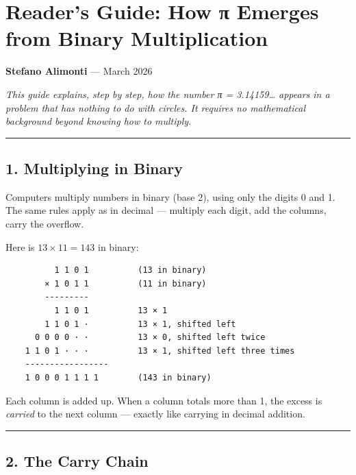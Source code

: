 \documentclass[
  11pt,
]{article}
\author{Stefano Alimonti --- stefalimonti@gmail.com}
\date{March 2026}
\begin{document}
{
\hypersetup{linkcolor=black}
\setcounter{tocdepth}{2}
\tableofcontents
}
\section{Reader's Guide: How π Emerges from Binary
Multiplication}\label{readers-guide-how-ux3c0-emerges-from-binary-multiplication}

\textbf{Stefano Alimonti} --- March 2026

\emph{This guide explains, step by step, how the number π = 3.14159\ldots{}
appears in a problem that has nothing to do with circles. It requires no
mathematical background beyond knowing how to multiply.}

\begin{center}\rule{0.5\linewidth}{0.5pt}\end{center}

\newpage

\subsection{1. Multiplying in Binary}\label{multiplying-in-binary}

Computers multiply numbers in binary (base 2), using only the digits 0 and 1.
The same rules apply as in decimal --- multiply each digit, add the columns,
carry the overflow.

Here is \(13 \times 11 = 143\) in binary:

\begin{verbatim}
          1 1 0 1          (13 in binary)
        × 1 0 1 1          (11 in binary)
        ---------
          1 1 0 1          13 × 1
        1 1 0 1 ·          13 × 1, shifted left
      0 0 0 0 · ·          13 × 0, shifted left twice
    1 1 0 1 · · ·          13 × 1, shifted left three times
    -----------------
    1 0 0 0 1 1 1 1        (143 in binary)
\end{verbatim}

Each column is added up. When a column totals more than 1, the excess is
\emph{carried} to the next column --- exactly like carrying in decimal addition.

\begin{center}\rule{0.5\linewidth}{0.5pt}\end{center}

\newpage

\subsection{2. The Carry Chain}\label{the-carry-chain}
\end{document}
